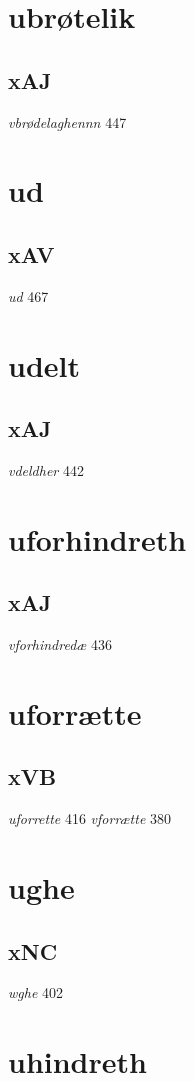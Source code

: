 \documentclass[a4paper,twocolumn]{article}
\begin{document}
\section{ubrøtelik}
\label{sec:org1e09939}
\subsection{xAJ}
\label{sec:org4b01a25}
\emph{vbrødelaghennn} 447 
\section{ud}
\label{sec:orga33d6bb}
\subsection{xAV}
\label{sec:org578431c}
\emph{ud} 467 
\section{udelt}
\label{sec:org8dd0445}
\subsection{xAJ}
\label{sec:orgc5aedd0}
\emph{vdeldher} 442 
\section{uforhindreth}
\label{sec:org167b04a}
\subsection{xAJ}
\label{sec:org5e4d564}
\emph{vforhindredæ} 436 
\section{uforrætte}
\label{sec:org7a88880}
\subsection{xVB}
\label{sec:org281fbbb}
\emph{uforrette} 416 \emph{vforrætte} 380 
\section{ughe}
\label{sec:org9c1fbfa}
\subsection{xNC}
\label{sec:org29e3f42}
\emph{wghe} 402 
\section{uhindreth}
\label{sec:org2ee5f56}
\end{document}

